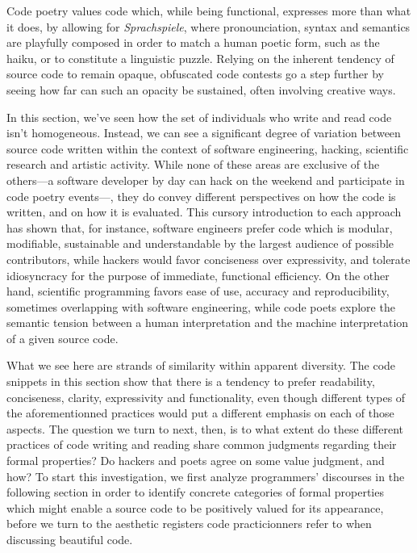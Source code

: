 Code poetry values code which, while being functional, expresses more than what it does, by allowing for \emph{Sprachspiele}, where pronounciation, syntax and semantics are playfully composed in order to match a human poetic form, such as the haiku, or to constitute a linguistic puzzle. Relying on the inherent tendency of source code to remain opaque, obfuscated code contests go a step further by seeing how far can such an opacity be sustained, often involving creative ways.

\vspace*{1\baselineskip}

In this section, we've seen how the set of individuals who write and read code isn't homogeneous. Instead, we can see a significant degree of variation between source code written within the context of software engineering, hacking, scientific research and artistic activity. While none of these areas are exclusive of the others—a software developer by day can hack on the weekend and participate in code poetry events—, they do convey different perspectives on how the code is written, and on how it is evaluated. This cursory introduction to each approach has shown that, for instance, software engineers prefer code which is modular, modifiable, sustainable and understandable by the largest audience of possible contributors, while hackers would favor conciseness over expressivity, and tolerate idiosyncracy for the purpose of immediate, functional efficiency. On the other hand, scientific programming favors ease of use, accuracy and reproducibility, sometimes overlapping with software engineering, while code poets explore the semantic tension between a human interpretation and the machine interpretation of a given source code.

What we see here are strands of similarity within apparent diversity. The code snippets in this section show that there is a tendency to prefer readability, conciseness, clarity, expressivity and functionality, even though different types of the aforementionned practices would put a different emphasis on each of those aspects. The question we turn to next, then, is to what extent do these different practices of code writing and reading share common judgments regarding their formal properties? Do hackers and poets agree on some value judgment, and how? To start this investigation, we first analyze programmers' discourses in the following section in order to identify concrete categories of formal properties which might enable a source code to be positively valued for its appearance, before we turn to the aesthetic registers code practicionners refer to when discussing beautiful code.

